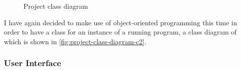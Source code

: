 \documentclass[11pt]{article}
\begin{document}
                \begin{figure}[!ht]
                    \centering
                    \caption{Project class diagram}
                    \label{fig:project-class-diagram-c2}
                \end{figure}

                I have again decided to make use of object-oriented programming this time in order to have a class for an instance of a running program, a class diagram of which is shown in \autoref{fig:project-class-diagram-c2}.

            \subsubsection{User Interface} 


                
\end{document}
